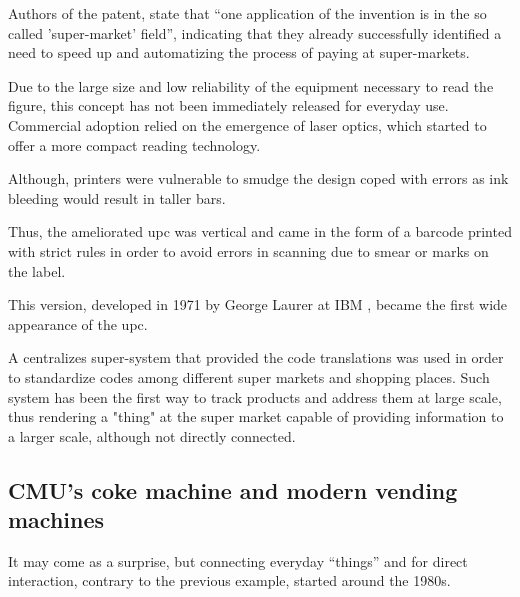 			Authors of the patent, state  that ``one application of the invention is in the so called 'super-market' field'', indicating that they already successfully identified a need to speed up and automatizing the process of paying at super-markets.
			
			Due to the large size and low reliability of the equipment necessary to read the figure, this concept has not been immediately released for everyday use.
			Commercial adoption relied on the emergence of laser optics, which started to offer a more compact reading technology.
			
			Although, printers were vulnerable to smudge the design coped with errors as ink bleeding would result in taller bars.
			
			Thus, the ameliorated upc was vertical and came in the form of a barcode printed with strict rules in order to avoid errors in scanning due to smear or marks on the label.
			
			This version, developed in 1971 by George Laurer at IBM \cite{upc_ibm}, became the first wide appearance of the upc.
			
			A centralizes super-system that provided the code translations was used in order to standardize codes among different super markets and shopping places.
			Such system has been the first way to track products and address them at large scale, thus rendering a "thing" at the super market capable of providing information to a larger scale, although not directly connected.
			
		\subsection{CMU's coke machine and modern vending machines}
	
		
			It may come as a surprise, but connecting everyday ``things'' and for direct interaction, contrary to the previous example, started around the 1980s.
			
